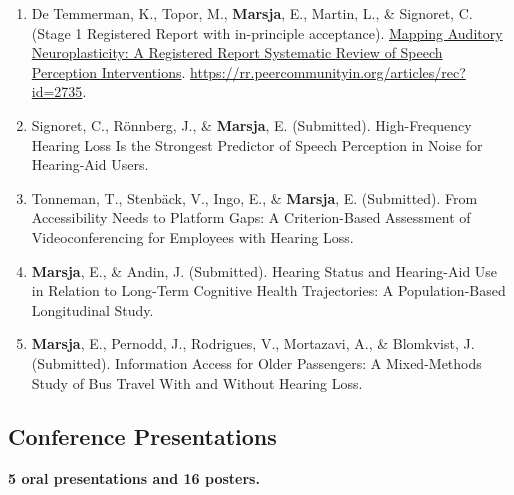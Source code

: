 \documentclass[]{article}
\begin{document}
\begin{enumerate}
\def\labelenumi{\arabic{enumi}.}
\item
  De Temmerman, K., Topor, M., \textbf{Marsja}, E., Martin, L., \&
  Signoret, C. (Stage 1 Registered Report with in-principle acceptance).
  \href{https://rr.peercommunityin.org/articles/rec?id=2735}{Mapping
  Auditory Neuroplasticity: A Registered Report Systematic Review of
  Speech Perception Interventions}.
  \url{https://rr.peercommunityin.org/articles/rec?id=2735}.
\item
  Signoret, C., Rönnberg, J., \& \textbf{Marsja}, E. (Submitted).
  High-Frequency Hearing Loss Is the Strongest Predictor of Speech
  Perception in Noise for Hearing-Aid Users.
\item
  Tonneman, T., Stenbäck, V., Ingo, E., \& \textbf{Marsja}, E.
  (Submitted). From Accessibility Needs to Platform Gaps: A
  Criterion-Based Assessment of Videoconferencing for Employees with
  Hearing Loss.
\item
  \textbf{Marsja}, E., \& Andin, J. (Submitted). Hearing Status and
  Hearing-Aid Use in Relation to Long-Term Cognitive Health
  Trajectories: A Population-Based Longitudinal Study.
\item
  \textbf{Marsja}, E., Pernodd, J., Rodrigues, V., Mortazavi, A., \&
  Blomkvist, J. (Submitted). Information Access for Older Passengers: A
  Mixed-Methods Study of Bus Travel With and Without Hearing Loss.
\end{enumerate}

\subsection{Conference Presentations}\label{conference-presentations}

\textbf{5 oral presentations and 16 posters.}
\end{document}
